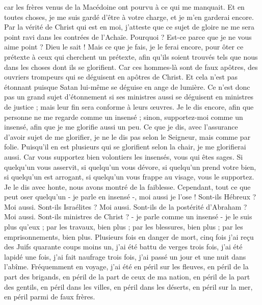 \begin{multicols}{2}
car les frères venus de la Macédoine ont pourvu à ce qui me manquait. Et en toutes choses, je me suis gardé d’être à votre charge, et je m'en garderai encore.
Par la vérité de Christ qui est en moi, j’atteste que ce sujet de gloire ne me sera point ravi dans les contrées de l'Achaïe.
Pourquoi ? Est-ce parce que je ne vous aime point ? Dieu le sait !
Mais ce que je fais, je le ferai encore, pour ôter ce prétexte à ceux qui cherchent un prétexte, afin qu’ils soient trouvés tels que nous dans les choses dont ils se glorifient.
Car ces hommes-là sont de faux apôtres, des ouvriers trompeurs qui se déguisent en apôtres de Christ.
Et cela n'est pas étonnant puisque Satan lui-même se déguise en ange de lumière.
Ce n'est donc pas un grand sujet d'étonnement si ses ministres aussi se déguisent en ministres de justice ; mais leur fin sera conforme à leurs œuvres.
Je le dis encore, afin que personne ne me regarde comme un insensé ; sinon, supportez-moi comme un insensé, afin que je me glorifie aussi un peu.
Ce que je dis, avec l’assurance d’avoir sujet de me glorifier, je ne le dis pas selon le Seigneur, mais comme par folie.
Puisqu’il en est plusieurs qui se glorifient selon la chair, je me glorifierai aussi.
Car vous supportez bien volontiers les insensés, vous qui êtes sages.
Si quelqu'un vous asservit, si quelqu'un vous dévore, si quelqu'un prend votre bien, si quelqu'un est arrogant, si quelqu'un vous frappe au visage, vous le supportez.
Je le dis avec honte, nous avons montré de la faiblesse. Cependant, tout ce que peut oser quelqu’un - je parle en insensé -, moi aussi je l’ose !
Sont-ils Hébreux ? Moi aussi. Sont-ils Israélites ? Moi aussi. Sont-ils de la postérité d'Abraham ? Moi aussi.
Sont-ils ministres de Christ ? - je parle comme un insensé - je le suis plus qu'eux ; par les travaux, bien plus ; par les blessures, bien plus ; par les emprisonnements, bien plus. Plusieurs fois en danger de mort,
cinq fois j’ai reçu des Juifs quarante coups moins un,
j'ai été battu de verges trois fois, j'ai été lapidé une fois, j'ai fait naufrage trois fois, j'ai passé un jour et une nuit dans l’abîme.
Fréquemment en voyage, j’ai été en péril sur les fleuves, en péril de la part des brigands, en péril de la part de ceux de ma nation, en péril de la part des gentils, en péril dans les villes, en péril dans les déserts, en péril sur la mer, en péril parmi de faux frères.

\end{multicols}
